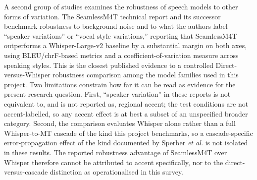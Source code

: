 A second group of studies examines the robustness of speech models to other forms of variation. The SeamlessM4T technical report \cite{seamlessm4t2023} and its successor \cite{seamless2023} benchmark robustness to background noise and to what the authors label ``speaker variations'' or ``vocal style variations,'' reporting that SeamlessM4T outperforms a Whisper-Large-v2 baseline by a substantial margin on both axes, using BLEU/chrF-based metrics and a coefficient-of-variation measure across speaking styles. This is the closest published evidence to a controlled Direct-versus-Whisper robustness comparison among the model families used in this project. Two limitations constrain how far it can be read as evidence for the present research question. First, ``speaker variation'' in these reports is not equivalent to, and is not reported as, regional accent; the test conditions are not accent-labelled, so any accent effect is at best a subset of an unspecified broader category. Second, the comparison evaluates Whisper alone rather than a full Whisper-to-MT cascade of the kind this project benchmarks, so a cascade-specific error-propagation effect of the kind documented by Sperber \textit{et al.} is not isolated in these results. The reported robustness advantage of SeamlessM4T over Whisper therefore cannot be attributed to accent specifically, nor to the direct-versus-cascade distinction as operationalised in this survey.

